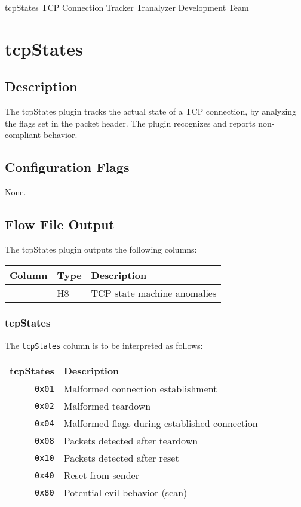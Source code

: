 \documentclass[documentation]{subfiles}
\begin{document}
\trantitle
    {tcpStates}
    {TCP Connection Tracker}
    {Tranalyzer Development Team} %

\section{tcpStates}\label{s:tcpStates}

\subsection{Description}
The tcpStates plugin tracks the actual state of a TCP connection, by analyzing the flags set in the packet header. The plugin recognizes and reports non-compliant behavior.

\subsection{Configuration Flags}
None.

\subsection{Flow File Output}
The tcpStates plugin outputs the following columns:
\begin{longtable}{lll}
    \toprule
    {\bf Column} & {\bf Type} & {\bf Description}\\
    \midrule\endhead%
    {\tt\nameref{tcpStates}} & H8 & TCP state machine anomalies\\
    \bottomrule
\end{longtable}

\subsubsection{tcpStates}\label{tcpStates}
The {\tt tcpStates} column is to be interpreted as follows:
\begin{longtable}{rl}
    \toprule
    {\bf tcpStates} & {\bf Description} \\
    \midrule\endhead%
    {\tt 0x01} & Malformed connection establishment \\
    {\tt 0x02} & Malformed teardown \\
    {\tt 0x04} & Malformed flags during established connection \\
    {\tt 0x08} & Packets detected after teardown \\
    {\tt 0x10} & Packets detected after reset \\
    {\tt 0x40} & Reset from sender \\
    {\tt 0x80} & Potential evil behavior (scan)\\
    \bottomrule
\end{longtable}
\end{document}
